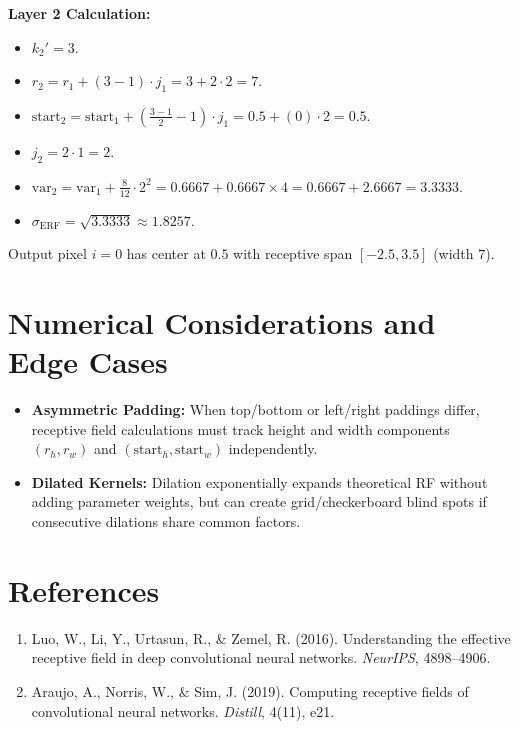 \documentclass[11pt,a4paper]{article}
\theoremstyle{definition}
\begin{document}
\textbf{Layer 2 Calculation:}
\begin{itemize}
    \item $k_2' = 3$.
    \item $r_2 = r_1 + (3 - 1) \cdot j_1 = 3 + 2 \cdot 2 = 7$.
    \item $\text{start}_2 = \text{start}_1 + \left( \frac{3-1}{2} - 1 \right) \cdot j_1 = 0.5 + (0) \cdot 2 = 0.5$.
    \item $j_2 = 2 \cdot 1 = 2$.
    \item $\text{var}_2 = \text{var}_1 + \frac{8}{12} \cdot 2^2 = 0.6667 + 0.6667 \times 4 = 0.6667 + 2.6667 = 3.3333$.
    \item $\sigma_{\text{ERF}} = \sqrt{3.3333} \approx 1.8257$.
\end{itemize}

Output pixel $i=0$ has center at $0.5$ with receptive span $[-2.5, 3.5]$ (width $7$).

\section{Numerical Considerations and Edge Cases}

\begin{itemize}
    \item \textbf{Asymmetric Padding:} When top/bottom or left/right paddings differ, receptive field calculations must track height and width components $(r_h, r_w)$ and $(\text{start}_h, \text{start}_w)$ independently.
    \item \textbf{Dilated Kernels:} Dilation exponentially expands theoretical RF without adding parameter weights, but can create grid/checkerboard blind spots if consecutive dilations share common factors.
\end{itemize}

\section{References}
\begin{enumerate}
    \item Luo, W., Li, Y., Urtasun, R., \& Zemel, R. (2016). Understanding the effective receptive field in deep convolutional neural networks. \emph{NeurIPS}, 4898--4906.
    \item Araujo, A., Norris, W., \& Sim, J. (2019). Computing receptive fields of convolutional neural networks. \emph{Distill}, 4(11), e21.
\end{enumerate}
\end{document}

